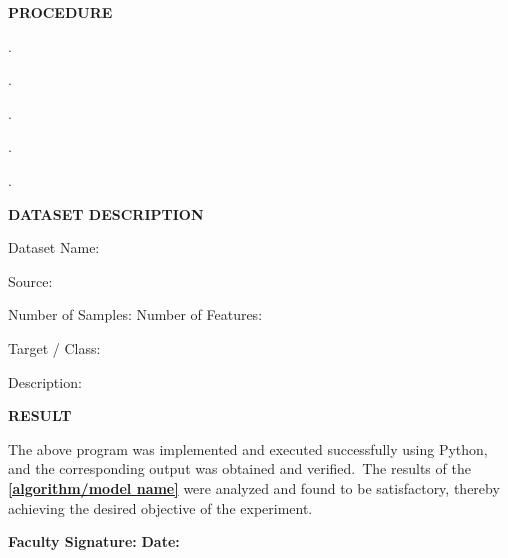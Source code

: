 \documentclass[11pt]{article}
\newcommand{\expheading}[1]{{\fontsize{14}{17}\selectfont\textbf{#1}}\par}
\begin{document}
\expheading{PROCEDURE}
\vspace{4pt}
. \hrulefill\par
{}. \hrulefill\par
{}. \hrulefill\par
{}. \hrulefill\par
{}. \hrulefill\par
\vspace{4pt}

\expheading{DATASET DESCRIPTION}
\vspace{4pt}
\noindent Dataset Name: \hrulefill\par
\noindent Source: \hrulefill\par
\noindent Number of Samples: \underline{\hspace{2.8cm}} \hspace{0.3cm} Number of Features: \underline{\hspace{2.8cm}}\par
\noindent Target / Class: \hrulefill\par
\noindent Description: \hrulefill\par
\noindent\underline{\hspace*{\textwidth}}\par
\noindent\underline{\hspace*{\textwidth}}\par
\vspace{4pt}

\expheading{RESULT}
\vspace{4pt}
{\fontsize{12}{15}\selectfont
The above program was implemented and executed successfully using Python, and the corresponding output was obtained and verified.\ The results of the \underline{\textbf{[algorithm/model name]}} were analyzed and found to be satisfactory, thereby achieving the desired objective of the experiment.\par
}

\vspace{6pt}

\noindent\textbf{Faculty Signature:} \underline{\hspace{3.6cm}} \hfill \textbf{Date:} \underline{\hspace{2.8cm}}\par
\end{document}
